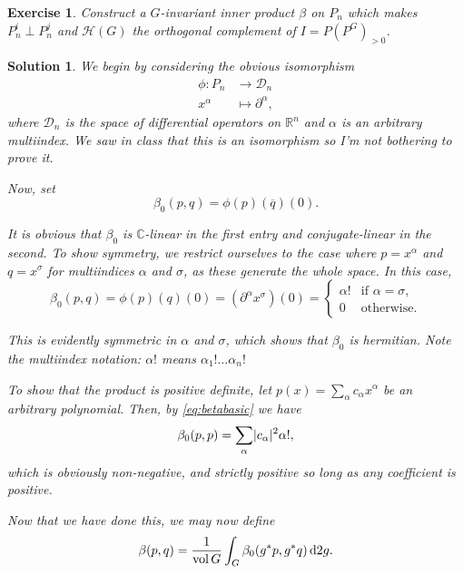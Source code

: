 \documentclass{article}
\newtheorem{ex}{Exercise}
\theoremstyle{nonumberplain}
\newtheorem{sol}{Solution}
\newcommand{\R}{\mathbb{R}}
\newcommand{\C}{\mathbb{C}}
\newcommand{\DD}{\mathcal{D}}
\newcommand{\conj}[1]{\overline{#1}}
\DeclareMathOperator{\vol}{vol}
\newcommand{\HH}{\mathcal{H}}
\DeclarePairedDelimiter{\abs}{\lvert}{\rvert}
\begin{document}
\begin{ex}
Construct a $G$-invariant inner product $\beta$ on $P_n$ which makes $P^i_n \perp P^j_n$ and $\HH(G)$ the orthogonal complement of $I = P (P^G)_{>0}$.
\end{ex}

\begin{sol}
We begin by considering the obvious isomorphism
\begin{equation}
\begin{aligned}
\phi \colon P_n &\to \DD_n\\
x^\alpha &\mapsto \partial^\alpha,
\end{aligned}
\end{equation}
where $\DD_n$ is the space of differential operators on $\R^n$ and $\alpha$ is an arbitrary multiindex. We saw in class that this is an isomorphism so I'm not bothering to prove it.

Now, set
\begin{equation}
\beta_0(p,q) = \phi(p)(\conj q)(0).
\end{equation}

It is obvious that $\beta_0$ is $\C$-linear in the first entry and conjugate-linear in the second. To show symmetry, we restrict ourselves to the case where $p = x^\alpha$ and $q = x^\sigma$ for multiindices $\alpha$ and $\sigma$, as these generate the whole space. In this case,
\begin{equation}\label{eq:betabasic}
\beta_0(p,q) = \phi(p)(q)(0) = (\partial^\alpha x^\sigma)(0) = \begin{cases}
\alpha! & \text{if $\alpha = \sigma$,}\\
0 & \text{otherwise.}
\end{cases}
\end{equation}

This is evidently symmetric in $\alpha$ and $\sigma$, which shows that $\beta_0$ is hermitian. Note the multiindex notation: $\alpha!$ means $\alpha_1! \dots \alpha_n!$

To show that the product is positive definite, let $p(x) = \sum_\alpha c_\alpha x^\alpha$ be an arbitrary polynomial. Then, by \eqref{eq:betabasic} we have
\begin{equation}
\beta_0(p,p) = \sum_\alpha \abs{c_\alpha}^2 \alpha!,
\end{equation}
which is obviously non-negative, and strictly positive so long as any coefficient is positive.

Now that we have done this, we may now define
\begin{equation}
\beta(p,q) = \frac1{\vol G} \int_G \beta_0(g^* p, g^* q) \dl2 g.
\end{equation}


\end{sol}
\end{document}
